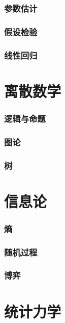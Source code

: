 \documentclass[UTF8]{ctexart}
\newcommand{\sectionbreak}{\clearpage}
\begin{document}
\section{参数估计}
\sectionbreak

\section{假设检验}
\sectionbreak

\section{线性回归}

\sectionbreak

\part{离散数学}
\section{逻辑与命题}

\section{图论}

\section{树}

\sectionbreak

\part{信息论}
\section{熵}

\section{随机过程}

\section{博弈}

\sectionbreak

\part{统计力学}
\end{document}
